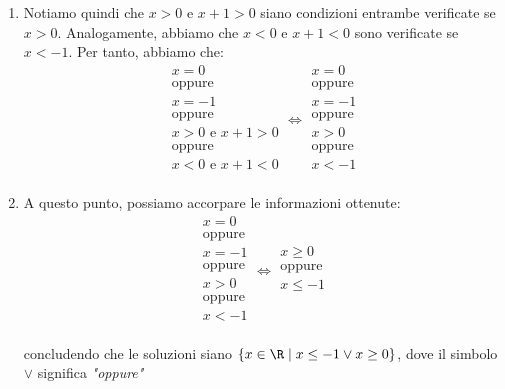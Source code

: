\documentclass[a4paper, 12pt]{report}
\begin{document}
\begin{enumerate}
        \newpage

        \item Notiamo quindi che $x > 0$ e $x+1 > 0$ siano condizioni entrambe verificate se $x > 0$. Analogamente, abbiamo che $x < 0$ e $x+1 < 0$ sono verificate se $x < -1$. Per tanto, abbiamo che:
        \[\begin{array}{c}
            x = 0 \\
            \text{oppure} \\
            x = -1 \\
            \text{oppure} \\
            x > 0 \text{ e } x+1 > 0\\
            \text{oppure} \\
            x < 0 \text{ e } x+1 < 0\\
        \end{array} \iff
        \begin{array}{c}
            x = 0 \\
            \text{oppure} \\
            x = -1 \\
            \text{oppure} \\
            x > 0\\
            \text{oppure} \\
            x < -1\\
        \end{array}\]

        \item A questo punto, possiamo accorpare le informazioni ottenute:
        \[
        \begin{array}{c}
            x = 0 \\
            \text{oppure} \\
            x = -1 \\
            \text{oppure} \\
            x > 0\\
            \text{oppure} \\
            x < -1\\
        \end{array} \iff
        \begin{array}{c}
            x \geq 0 \\
            \text{oppure} \\
            x \leq -1 \\
        \end{array}\]

        concludendo che le soluzioni siano $\{x \in \R \mid x \leq -1 \lor x \geq 0\}$, dove il simbolo $\lor$ significa \textit{"oppure"}
    \end{enumerate}
\end{document}
